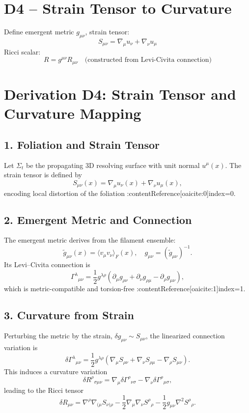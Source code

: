 

\section*{D4 – Strain Tensor to Curvature}
Define emergent metric \( g_{\mu\nu} \), strain tensor:
\[
S_{\mu\nu} = \nabla_\mu u_\nu + \nabla_\nu u_\mu
\]
Ricci scalar:
\[
R = g^{\mu\nu} R_{\mu\nu} \quad \text{(constructed from Levi-Civita connection)}
\]


\section*{Derivation D4: Strain Tensor and Curvature Mapping}
\subsection*{1. Foliation and Strain Tensor}
Let \(\Sigma_t\) be the propagating 3D resolving surface with unit normal \(u^\mu(x)\). The strain tensor is defined by
\[
S_{\mu\nu}(x) = \nabla_\mu u_\nu(x) + \nabla_\nu u_\mu(x),
\]
encoding local distortion of the foliation :contentReference[oaicite:0]{index=0}.

\subsection*{2. Emergent Metric and Connection}
The emergent metric derives from the filament ensemble:
\[
\tilde g_{\mu\nu}(x) = \langle v_\mu v_\nu\rangle_F(x),\quad g_{\mu\nu} = (\tilde g_{\mu\nu})^{-1}.
\]
Its Levi–Civita connection is
\[
\Gamma^\lambda{}_{\mu\nu} = \frac12 g^{\lambda\rho}(\partial_\mu g_{\rho\nu} + \partial_\nu g_{\rho\mu} - \partial_\rho g_{\mu\nu}),
\]
which is metric-compatible and torsion-free :contentReference[oaicite:1]{index=1}.

\subsection*{3. Curvature from Strain}
Perturbing the metric by the strain, \(\delta g_{\mu\nu} \sim S_{\mu\nu}\), the linearized connection variation is
\[
\delta \Gamma^\lambda{}_{\mu\nu} = \frac12 g^{\lambda\rho}(\nabla_\mu S_{\rho\nu} + \nabla_\nu S_{\rho\mu} - \nabla_\rho S_{\mu\nu}).
\]
This induces a curvature variation
\[
\delta R^\rho{}_{\sigma\mu\nu} = \nabla_\mu \delta\Gamma^\rho{}_{\nu\sigma} - \nabla_\nu \delta\Gamma^\rho{}_{\mu\sigma},
\]
leading to the Ricci tensor
\[
\delta R_{\mu\nu} = \nabla^\rho\nabla_{(\mu}S_{\nu)\rho} - \frac12\nabla_\mu\nabla_\nu S^\rho{}_\rho - \frac12 g_{\mu\nu}\nabla^2 S^\rho{}_\rho.
\]

